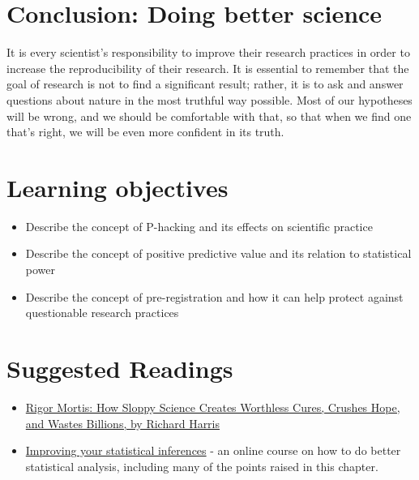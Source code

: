 \documentclass[12pt,]{book}
\providecommand{\tightlist}{%
  \setlength{\itemsep}{0pt}\setlength{\parskip}{0pt}}
\theoremstyle{definition}
\theoremstyle{definition}
\theoremstyle{definition}
\theoremstyle{remark}
\begin{document}
\hypertarget{conclusion-doing-better-science}{%
\section{Conclusion: Doing better science}\label{conclusion-doing-better-science}}

It is every scientist's responsibility to improve their research practices in order to increase the reproducibility of their research. It is essential to remember that the goal of research is not to find a significant result; rather, it is to ask and answer questions about nature in the most truthful way possible. Most of our hypotheses will be wrong, and we should be comfortable with that, so that when we find one that's right, we will be even more confident in its truth.

\hypertarget{learning-objectives-15}{%
\section{Learning objectives}\label{learning-objectives-15}}

\begin{itemize}
\tightlist
\item
  Describe the concept of P-hacking and its effects on scientific practice
\item
  Describe the concept of positive predictive value and its relation to statistical power
\item
  Describe the concept of pre-registration and how it can help protect against questionable research practices
\end{itemize}

\hypertarget{suggested-readings-11}{%
\section{Suggested Readings}\label{suggested-readings-11}}

\begin{itemize}
\tightlist
\item
  \href{https://www.amazon.com/dp/B01K3WN72C}{Rigor Mortis: How Sloppy Science Creates Worthless Cures, Crushes Hope, and Wastes Billions, by Richard Harris}
\item
  \href{https://www.coursera.org/learn/statistical-inferences}{Improving your statistical inferences} - an online course on how to do better statistical analysis, including many of the points raised in this chapter.
\end{itemize}
\end{document}
